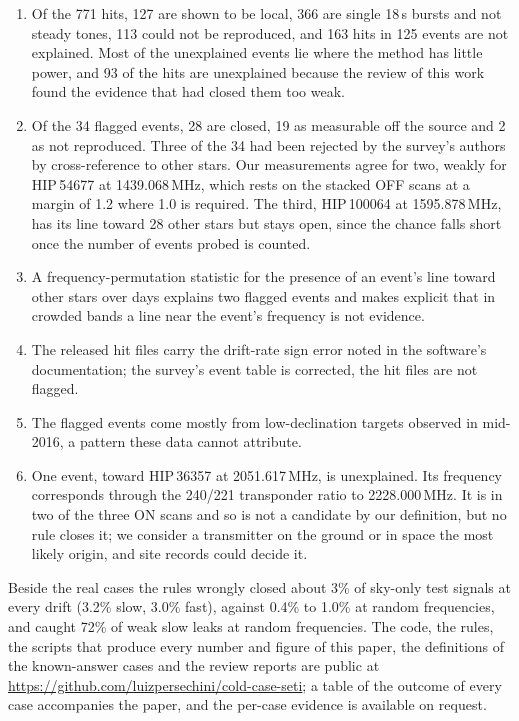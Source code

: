 \documentclass[twocolumn]{aastex631}
\begin{document}
\begin{enumerate}
\item Of the 771 hits, 127 are shown to be local, 366 are single 18\,s
bursts and not steady tones, 113 could not be reproduced, and 163 hits in
125 events are not explained. Most of the unexplained events lie where the
method has little power, and 93 of the hits are unexplained because the
review of this work found the evidence that had closed them too weak.
\item Of the 34 flagged events, 28 are closed, 19 as measurable off the
source and 2 as not reproduced. Three of the 34 had been rejected by the
survey's authors by cross-reference to other stars. Our measurements agree
for two, weakly for HIP\,54677 at 1439.068\,MHz, which rests on the stacked
OFF scans at a margin of 1.2 where 1.0 is required. The third, HIP\,100064
at 1595.878\,MHz, has its line toward 28 other stars but stays open, since
the chance falls short once the number of events probed is counted.
\item A frequency-permutation statistic for the presence of an event's line
toward other stars over days explains two flagged events and makes
explicit that in crowded bands a line near the event's frequency is not
evidence.
\item The released hit files carry the drift-rate sign error noted in the
software's documentation; the survey's event table is corrected, the hit
files are not flagged.
\item The flagged events come mostly from low-declination targets observed
in mid-2016, a pattern these data cannot attribute.
\item One event, toward HIP\,36357 at 2051.617\,MHz, is unexplained. Its
frequency corresponds through the 240/221 transponder ratio to
2228.000\,MHz. It is in two of the three ON scans and so is not a
candidate by our definition, but no rule closes it; we consider a
transmitter on the ground or in space the most likely origin, and site
records could decide it.
\end{enumerate}

Beside the real cases the rules wrongly closed about 3\% of sky-only test
signals at every drift (3.2\% slow, 3.0\% fast), against 0.4\% to 1.0\% at
random frequencies, and caught 72\% of weak slow leaks at random
frequencies. The code, the rules, the scripts
that produce every number and figure of this paper, the definitions of the
known-answer cases and the review reports are public at
\url{https://github.com/luizpersechini/cold-case-seti}; a table of the
outcome of every case accompanies the paper, and the per-case evidence is
available on request.
\end{document}
